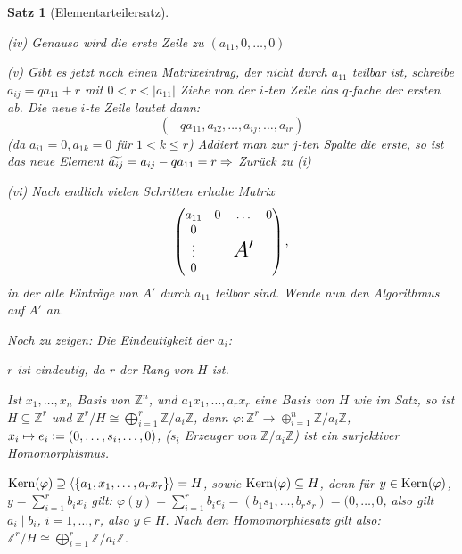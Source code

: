 \documentclass[a4paper,10pt,german]{scrbook}
\theoremstyle{saetze}
\newtheorem{Satz}{Satz}
\theoremstyle{definitionen}
\begin{document}
\begin{Satz}[Elementarteilersatz]
{\begin{enum}
            \item[(iv)] Genauso wird die erste Zeile zu $(a_{11}, 0, \dots, 0)$
            
            \item[(v)] Gibt es jetzt noch einen Matrixeintrag, der nicht durch 
            $a_{11}$ teilbar ist, schreibe $a_{ij} = q a_{11} + r$ mit $0 < r <
            |a_{11}|$ Ziehe von der $i$-ten Zeile das $q$-fache der ersten ab. 
            Die neue $i$-te Zeile lautet dann: \[(-q a_{11}, a_{i2}, \dots, 
            a_{ij}, \dots, a_{ir})\] (da $a_{i1} = 0, a_{1k} = 0$ für $1<k\leq
            r$) \newline
            Addiert man zur $j$-ten Spalte die erste, so ist das neue Element
            $\widetilde{a_{ij}} = a_{ij} - q a_{11} = r \Rightarrow$ Zurück zu (i)
            
            \item[(vi)] Nach endlich vielen Schritten erhalte Matrix 
            \[\begin{pmatrix} a_{11} & 0 & \hdots & 0 \\ 0 \\ \vdots &  & 
            \mbox{\LARGE $A'$}\\ 0 \end{pmatrix},\] in der alle Einträge von
            $A'$ durch $a_{11}$ teilbar sind. Wende nun den Algorithmus auf $A'$ an.
        \end{enum}


        Noch zu zeigen: Die Eindeutigkeit der $a_i$:

	$r$ ist eindeutig, da $r$ der Rang von $H$ ist.

	Ist $x_1,\ldots,x_n$ Basis von $\mathbb Z^n$, und $a_1x_1,\ldots,a_rx_r$ eine Basis
	von $H$ wie im Satz, so ist $H \subseteq \mathbb Z^r$ und $\mathbb Z^r/H \cong
	\bigoplus_{i=1}^r \mathbb Z/ a_i\mathbb Z$, denn $\varphi : \mathbb Z^r\to \oplus_{i=1}^n \mathbb Z/a_i\mathbb Z$, $x_i\mapsto e_i\mathrel{\mathop:}= (0,\ldots,s_i,\ldots,0)$, ($s_i$ Erzeuger von $\mathbb Z/a_i\mathbb Z$) ist ein surjektiver Homomorphismus. 

	$\mathop{\rm Kern}\nolimits(\varphi) \supseteq \langle\{a_1,x_1,\ldots,a_rx_r\}\rangle = H$, sowie $\mathop{\rm Kern}\nolimits(\varphi) \subseteq H$, denn für $y\in \mathop{\rm Kern}\nolimits(\varphi)$, $y=\sum_{i=1}^r b_ix_i$ gilt: $\varphi(y) = \sum_{i=1}^r b_i e_i = (b_1s_1,\ldots,b_rs_r) = (0,\ldots,0$, also gilt $a_i\mid b_i$, $i=1,\ldots,r$, also $y\in H$. Nach dem Homomorphiesatz gilt also: $\mathbb Z^r/H \cong
	\bigoplus_{i=1}^r \mathbb Z/ a_i\mathbb Z$.

}
\end{Satz}
\end{document}
